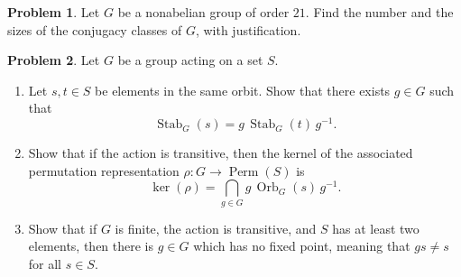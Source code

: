 \documentclass[11pt]{article}
\DeclareMathOperator{\Perm}{Perm}
\DeclareMathOperator{\Stab}{Stab}
\DeclareMathOperator{\Orb}{Orb}
\theoremstyle{definition}
\newtheorem{problem}{Problem}
\begin{document}
\begin{problem}
Let $G$ be a nonabelian group of order $21$. Find the number and the sizes of the conjugacy classes of $G$, with justification.
\end{problem}


\begin{problem}
	Let $G$ be a group acting on a set $S$.
	
\begin{enumerate}[label=(5.\arabic*)]	
\item Let $s, t \in S$ be elements in the same orbit. Show that there exists $g \in G$ such that
		$$\Stab_G(s) = g \, \Stab_G(t) \, g^{-1}.$$
\item Show that if the action is transitive, then the kernel of the associated permutation representation $\rho\!: G \to \Perm(S)$ is
$$\ker(\rho) = \bigcap_{g \in G} g \, \Orb_G(s) \, g^{-1}.$$
\item Show that if $G$ is finite, the action is transitive, and $S$ has at least two elements, then there is $g \in G$ which has no fixed point, meaning that $gs \neq s$ for all $s \in S$.
\end{enumerate}
\end{problem}
\end{document}
